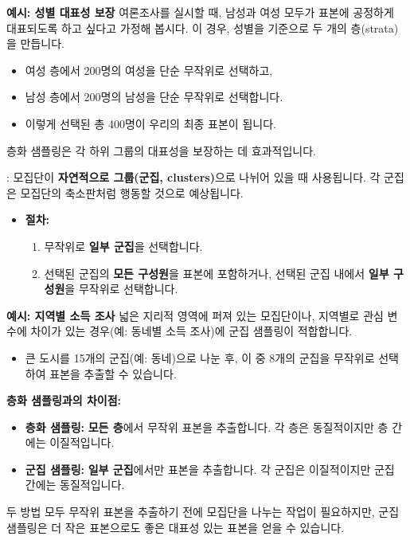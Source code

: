 \documentclass[11pt,a4paper]{article}
\theoremstyle{definition}
\begin{document}
\begin{examplebox}
\textbf{예시: 성별 대표성 보장}
여론조사를 실시할 때, 남성과 여성 모두가 표본에 공정하게 대표되도록 하고 싶다고 가정해 봅시다. 이 경우, 성별을 기준으로 두 개의 층(strata)을 만듭니다.
\begin{itemize}
    \item 여성 층에서 200명의 여성을 단순 무작위로 선택하고,
    \item 남성 층에서 200명의 남성을 단순 무작위로 선택합니다.
    \item 이렇게 선택된 총 400명이 우리의 최종 표본이 됩니다.
\end{itemize}
층화 샘플링은 각 하위 그룹의 대표성을 보장하는 데 효과적입니다.
\end{examplebox}

\begin{tcolorbox}[infobox, title={확률 샘플링 기법 (3/3): 군집 샘플링 (Cluster Sampling)}]
: 모집단이 \textbf{자연적으로 그룹(군집, clusters)}으로 나뉘어 있을 때 사용됩니다. 각 군집은 모집단의 축소판처럼 행동할 것으로 예상됩니다.
\begin{itemize}
    \item \textbf{절차:}
    \begin{enumerate}
        \item 무작위로 \textbf{일부 군집}을 선택합니다.
        \item 선택된 군집의 \textbf{모든 구성원}을 표본에 포함하거나, 선택된 군집 내에서 \textbf{일부 구성원}을 무작위로 선택합니다.
    \end{enumerate}
\end{itemize}
\end{tcolorbox}

\begin{examplebox}
\textbf{예시: 지역별 소득 조사}
넓은 지리적 영역에 퍼져 있는 모집단이나, 지역별로 관심 변수에 차이가 있는 경우(예: 동네별 소득 조사)에 군집 샘플링이 적합합니다.
\begin{itemize}
    \item 큰 도시를 15개의 군집(예: 동네)으로 나눈 후, 이 중 8개의 군집을 무작위로 선택하여 표본을 추출할 수 있습니다.
\end{itemize}
\textbf{층화 샘플링과의 차이점:}
\begin{itemize}
    \item \textbf{층화 샘플링:} \textbf{모든 층}에서 무작위 표본을 추출합니다. 각 층은 동질적이지만 층 간에는 이질적입니다.
    \item \textbf{군집 샘플링:} \textbf{일부 군집}에서만 표본을 추출합니다. 각 군집은 이질적이지만 군집 간에는 동질적입니다.
\end{itemize}
두 방법 모두 무작위 표본을 추출하기 전에 모집단을 나누는 작업이 필요하지만, 군집 샘플링은 더 작은 표본으로도 좋은 대표성 있는 표본을 얻을 수 있습니다.
\end{examplebox}
\end{document}
